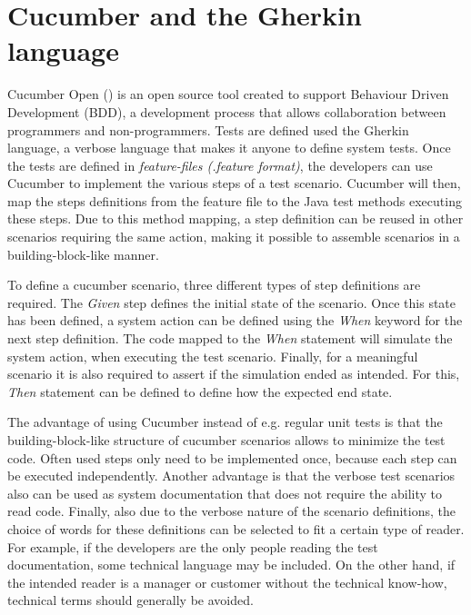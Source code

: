 

\section{Cucumber and the Gherkin language}
Cucumber Open (\cite{cucumber}) is an open source tool created to support Behaviour Driven Development (BDD), a development process that allows collaboration between programmers and non-programmers. Tests are defined used the Gherkin language, a verbose language that makes it anyone to define system tests. Once the tests are defined in \emph{feature-files (.feature format)}, the developers can use Cucumber to implement the various steps of a test scenario. Cucumber will then, map the steps definitions from the feature file to the Java test methods executing these steps. Due to this method mapping, a step definition can be reused in other scenarios requiring the same action, making it possible to assemble scenarios in a building-block-like manner.

To define a cucumber scenario, three different types of step definitions are required. The \emph{Given} step defines the initial state of the scenario. Once this state has been defined, a system action can be defined using the \emph{When} keyword for the next step definition. The code mapped to the \emph{When} statement will simulate the system action, when executing the test scenario. Finally, for a meaningful scenario it is also required to assert if the simulation ended as intended. For this, \emph{Then} statement can be defined to define how the expected end state.

The advantage of using Cucumber instead of e.g. regular unit tests is that the building-block-like structure of cucumber scenarios allows to minimize the test code. Often used steps only need to be implemented once, because each step can be executed independently. Another advantage is that the verbose test scenarios also can be used as system documentation that does not require the ability to read code. Finally, also due to the verbose nature of the scenario definitions, the choice of words for these definitions can be selected to fit a certain type of reader. For example, if the developers are the only people reading the test documentation, some technical language may be included. On the other hand, if the intended reader is  a manager or customer without the technical know-how, technical terms should generally be avoided.

